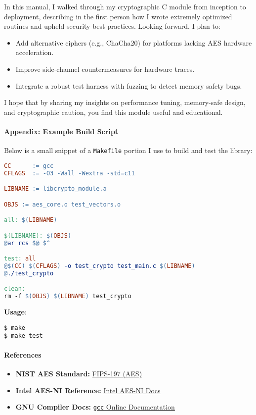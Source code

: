 In this manual, I walked through my cryptographic C module from inception to deployment, describing in the first person how I wrote extremely optimized routines and upheld security best practices. Looking forward, I plan to:

\begin{itemize}
	\item Add alternative ciphers (e.g., ChaCha20) for platforms lacking AES hardware acceleration.
	\item Improve side-channel countermeasures for hardware traces.
	\item Integrate a robust test harness with fuzzing to detect memory safety bugs.
\end{itemize}

I hope that by sharing my insights on performance tuning, memory-safe design, and cryptographic caution, you find this module useful and educational.

\paragraph{Appendix: Example Build Script}

Below is a small snippet of a \texttt{Makefile} portion I use to build and test the library:

\begin{lstlisting}[language=make]
CC      := gcc
CFLAGS  := -O3 -Wall -Wextra -std=c11

LIBNAME := libcrypto_module.a

OBJS := aes_core.o test_vectors.o

all: $(LIBNAME)

$(LIBNAME): $(OBJS)
@ar rcs $@ $^

test: all
@$(CC) $(CFLAGS) -o test_crypto test_main.c $(LIBNAME)
@./test_crypto

clean:
rm -f $(OBJS) $(LIBNAME) test_crypto
\end{lstlisting}

\textbf{Usage}:
\begin{verbatim}
$ make
$ make test
\end{verbatim}

\paragraph{References}

\begin{itemize}
	\item \textbf{NIST AES Standard:} \href{https://nvlpubs.nist.gov/nistpubs/FIPS/NIST.FIPS.197.pdf}{FIPS-197 (AES)}
	\item \textbf{Intel AES-NI Reference:} \href{https://www.intel.com/content/www/us/en/developer/articles/technical/intel-advanced-encryption-standard-aes-instructions-set.html}{Intel AES-NI Docs}
	\item \textbf{GNU Compiler Docs:} \href{https://gcc.gnu.org/onlinedocs/}{\texttt{gcc} Online Documentation}
\end{itemize}